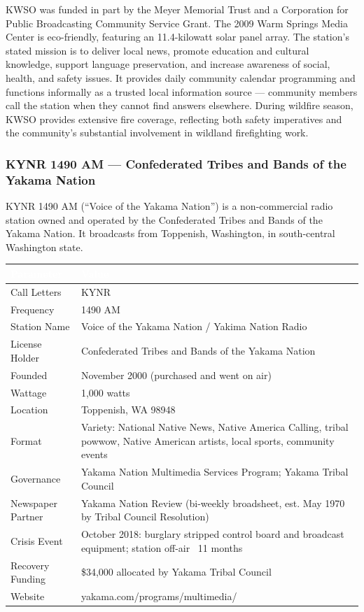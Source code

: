 \documentclass[11pt,letterpaper]{article}
\newcommand{\tableheader}[1]{\textbf{\sffamily\textcolor{white}{#1}}}
\begin{document}
KWSO was funded in part by the Meyer Memorial Trust and a Corporation for Public Broadcasting Community Service Grant. The 2009 Warm Springs Media Center is eco-friendly, featuring an 11.4-kilowatt solar panel array. The station's stated mission is to deliver local news, promote education and cultural knowledge, support language preservation, and increase awareness of social, health, and safety issues. It provides daily community calendar programming and functions informally as a trusted local information source --- community members call the station when they cannot find answers elsewhere. During wildfire season, KWSO provides extensive fire coverage, reflecting both safety imperatives and the community's substantial involvement in wildland firefighting work.

\subsubsection{KYNR 1490 AM --- Confederated Tribes and Bands of the Yakama Nation}

KYNR 1490 AM (``Voice of the Yakama Nation'') is a non-commercial radio station owned and operated by the Confederated Tribes and Bands of the Yakama Nation. It broadcasts from Toppenish, Washington, in south-central Washington state.

\begin{center}
\begin{tabularx}{\textwidth}{L{3.5cm}X}
\toprule
{}
\tableheader{Parameter} & \tableheader{Value} \\
\midrule
Call Letters & KYNR \\
Frequency & 1490 AM \\
Station Name & Voice of the Yakama Nation / Yakima Nation Radio \\
License Holder & Confederated Tribes and Bands of the Yakama Nation \\
Founded & November 2000 (purchased and went on air) \\
Wattage & 1,000 watts \\
Location & Toppenish, WA 98948 \\
Format & Variety: National Native News, Native America Calling, tribal powwow, Native American artists, local sports, community events \\
Governance & Yakama Nation Multimedia Services Program; Yakama Tribal Council \\
Newspaper Partner & Yakama Nation Review (bi-weekly broadsheet, est. May 1970 by Tribal Council Resolution) \\
Crisis Event & October 2018: burglary stripped control board and broadcast equipment; station off-air ~11 months \\
Recovery Funding & \$34,000 allocated by Yakama Tribal Council \\
Website & yakama.com/programs/multimedia/ \\
\bottomrule
\end{tabularx}
\end{center}
\end{document}
